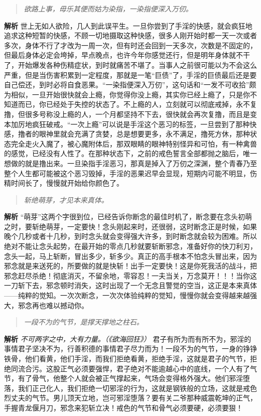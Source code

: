 \begin{quote}\it
    欲路上事，毋乐其便而姑为染指，一染指便深入万仞。
\end{quote}

\textbf{解析} 世上无如人欲险，几人到此误平生。一旦你尝到了手淫的快感，就会疯狂地追求这种短暂的快感，不顾一切地摄取这种快感，很多人刚开始时都一天一次或者多次，身体不行了才改为一周一次，但有时还会回到一天多次，次数是不固定的，但最后身体必定会垮掉，早点晚点，也许今年你感觉还行，但是明年身体就不干了，开始爆发各种伤精症状，到时就痛苦不堪了。当事人之前很可能以为不会这么严重，但是当伤害积累到一定程度，那就是一笔“巨债”了，手淫的巨债最后还是要自己偿还，到时必将自食恶果。“一染指便深入万仞”，这句话和“一发不可收拾”颇为相似，一旦开始很快就会上瘾，你觉得你没上瘾，其实你已经上瘾了，只是你不知道而已，你已经处于失控的状态了。不上瘾的人，立刻就可以彻底戒掉，永不复撸，但很多号称没上瘾的人，一个月都坚持不下去，很快就会再次复撸，而且是变本加厉地疯狂破戒。“一次上瘾”可以说是手淫这个恶习的标签，一旦尝到了那种快感，撸者的眼神里就会充满了贪婪，总是想要更多，永不满足，撸死方休，那种状态完全走火入魔了，被心魔附体后，那双眼睛的眼神特别怪异和可怕，有一种禽兽的感觉，已经没有人性了。在那种状态下，之前的戒色誓言全部都抛之脑后，唯一想做的就是撸出来。一旦染指手淫恶习，那真是掉入了万仞之深渊，整个青春乃至整个人生都可能被这个恶习毁掉，手淫的恶果迟早会显现，短期内可能不明显，伤精时间长了，慢慢就开始给你颜色了。

\begin{quote}\it
    斩绝萌芽，才见本来真体。
\end{quote}

\textbf{解析} “萌芽”这两个字很到位，已经告诉你断念的最佳时机了，断念要在念头初萌之时，要斩绝萌芽，一定要快！念头刚起来时，还很弱，这时断念正是时候，如果晚个几秒或者十几秒，到时念头就会变得强大许多，到时断念就会较为困难。所以绝对不能让念头起势，在最开始的零点几秒就要斩断邪念，准备好你的快刀利刃，念头一起，马上斩断，冒出多少，斩多少。真正的高手根本不怕念头冒出来，因为邪念就是来送死的，所要做的就是快斩！出手一定要快！这是你死我活的战斗，把邪念赶尽杀绝！彻底消灭，不留余地，零容忍！一夫当关，万念莫开！！！当你这一刀斩下去，邪念顿时消失，这时出现了一个无念且警觉的空当，这正是本来真体——纯粹的觉知。一次次断念，一次次体验纯粹的觉知，慢慢你就会变得越来越强大，邪念再也难以撼动你。

\begin{quote}\it
    一段不为的气节，是撑天撑地之柱石。
\end{quote}

\textbf{解析} \textit{不可两字之中，大有力量。（《欲海回狂》）} 君子有所为而有所不为，邪淫的事情君子坚决不为，行善积德的事情君子尽力而为！一段不为的气节，一身的铮铮铁骨，他们看黄，他们手淫，而我们拒绝看黄，拒绝手淫，这就是君子的气节，拒绝同流合污。这股正气必须要强悍，君子绝对不能逾越心中的底线，一个人有了气节，有了骨气，他整个人就会被正气撑起来，气场会变得格外强大。他们邪淫堕落，我们正己化人，我们拒绝一切邪淫的行为，这就是钢铁般的立场，这就是戒色烈丈夫的气节。男儿顶天立地，岂可邪淫堕落？要有关二爷那种威震乾坤的正气，手握青龙偃月刀，邪念来犯斩立决！戒色的气节和骨气必须要硬，必须要狠！

